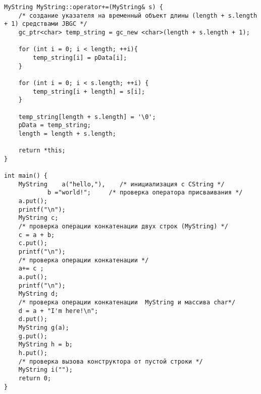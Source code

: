 \begin{lstlisting}
MyString MyString::operator+=(MyString& s) {
    /* создание указателя на временный объект длины (length + s.length + 1) средствами JBGC */
    gc_ptr<char> temp_string = gc_new <char>(length + s.length + 1);

    for (int i = 0; i < length; ++i){
        temp_string[i] = pData[i];
    }

    for (int i = 0; i < s.length; ++i) {
        temp_string[i + length] = s[i];
    }

    temp_string[length + s.length] = '\0';
    pData = temp_string;
    length = length + s.length;

    return *this;
}

int main() {
	MyString	a("hello,"),	/* инициализация с CString */	
			b ="world!";	 /* проверка оператора присваивания */
	a.put();
	printf("\n");	
	MyString c;		
	/* проверка операции конкатенации двух строк (MyString) */
	c = a + b;			
	c.put();
	printf("\n");	
	/* проверка операции конкатенации */
	a+= c ;	
	a.put();
	printf("\n");
	MyString d;
	/* проверка операции конкатенации  MyString и массива char*/
	d = a + "I'm here!\n";	
	d.put();
	MyString g(a);	
	g.put();	
	MyString h = b;
	h.put();
	/* проверка вызова конструктора от пустой строки */
	MyString i("");			
	return 0;
}
\end{lstlisting}
